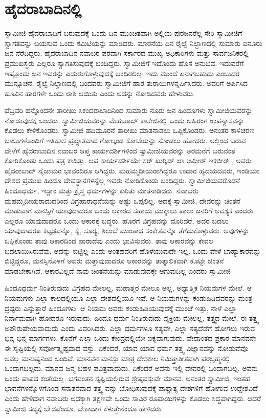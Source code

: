 
\chapter{ಹೈದರಾಬಾದಿನಲ್ಲಿ }

 ಸ್ವಾಮೀಜಿ ಹೈದರಾಬಾದಿಗೆ ಬರುವುದಕ್ಕೆ ಒಂದು ದಿನ ಮುಂಚಿತವಾಗಿ ಅಲ್ಲಿಯ ಪುರಜನರೆಲ್ಲ ಸೇರಿ ಸ್ವಾಮೀಜಿಗೆ ಸ್ವಾಗತವನ್ನು ಬಯಸುವ ಒಂದು ಕಮಿಟಿಯನ್ನು ಮಾಡಿದರು. ಮಾರನೆಯ ದಿನ ರೈಲ್ವೆ ನಿಲ್ದಾಣದಲ್ಲಿ ಸುಮಾರು ಐನೂರು ಜನ ನೆರೆದಿದ್ದರು. ಹೈದರಾಬಾದಿನ ನವಾಬರ ಪರವಾಗಿ ಸರ್ಕಾರದ ಮುಖ್ಯ ಅಧಿಕಾರಿಗಳು ಮತ್ತು ಸಾರ್ವಜನಿಕರಲ್ಲಿ ಪ್ರಮುಖಸ್ಥರು ಎಲ್ಲರೂ ಸ್ವಾಗತಿಸುವುದಕ್ಕೆ ಬಂದಿದ್ದರು. ಸ್ವಾಮೀಜಿಗೆ ಇದೊಂದು ಹೊಸ ಅನುಭವ. ಇದುವರೆಗೆ ಇಷ್ಟೊಂದು ಜನ ಇವರನ್ನು ಎದುರುಗೊಳ್ಳುವುದಕ್ಕೆ ಬಂದಿರಲಿಲ್ಲ. ಇದು ಮುಂದೆ ಏನಾಗಬಹುದು ಎಂಬುದರ ಮುನ್ಸೂಚನೆ. ರೈಲ್ವೆ ನಿಲ್ದಾಣದಲ್ಲಿ ಬಂದವರು ಸ್ವಾಮೀಜಿಗೆ ಹಾರ ತುರಾಯಿಗಳನ್ನರ್ಪಿಸಿದರು. ಅವರಿಗೆ ಅರ್ಪಿಸಿದ ಹೂವಿನ ಹಾರಗಳೇ ಒಂದು ರಾಶಿ ಆಯಿತು ಎಂದು ಅದನ್ನು ನೋಡಿದವರು ಹೇಳುವರು. 

 ಫೆಬ್ರವರಿ ಹನ್ನೊಂದನೇ ತಾರೀಖು ಸಿಕಂದರಾಬಾದಿನಿಂದ ಸುಮಾರು ನೂರು ಜನ ಹಿಂದೂಗಳು ಸ್ವಾಮೀಜಿಯವರನ್ನು ನೋಡುವುದಕ್ಕೆ ಬಂದರು. ಸ್ವಾಮೀಜಿಯವರನ್ನು ಮೆಹಬೂಬ್ ಕಾಲೇಜಿನಲ್ಲಿ ಒಂದು ಬಹಿರಂಗ ಉಪನ್ಯಾಸವನ್ನು ಕೊಡಲು ಕೇಳಿಕೊಂಡರು. ಸ್ವಾಮೀಜಿ ಹದಿಮೂರನೆ ತಾರೀಖು ಮಾತನಾಡಲು ಒಪ್ಪಿಕೊಂಡರು. ಅನಂತರ ಕಾಳಿಚರಣ ಬಾಬುಗಳೊಂದಿಗೆ ಇತಿಹಾಸ ಪ್ರಖ್ಯಾತವಾದ ಗೋಲ್ಕಂಡ ಕೋಟೆಯನ್ನು ನೋಡಲು ಹೋದರು. ಅಲ್ಲಿಂದ ಬರುವ ವೇಳೆಗೆ ಹೈದರಾಬಾದಿನ ನವಾಬರ ಆಪ್ತ ಕಾರ್ಯದರ್ಶಿಗಳಿಂದ ಸ್ವಾಮೀಜಿಯವರನ್ನು ಅರಮನೆಗೆ ಬರುವಂತೆ ಕೋರಿಕೊಂಡು ಒಂದು ಪತ್ರ ಕಾದಿತ್ತು. ಆಪ್ತ ಕಾರ್ಯದರ್ಶಿಯೇ ಸರ್ ಖುರ್‍ಶಿದ್ ಜಾ ಆಮೀರ್ ಇಕಬೀರ್ , ಅವರು ಹೈದರಾಬಾದ್ ನೈಜಾಮರ ಭಾವಂದಿರೂ ಆಗಿದ್ದರು. ಮಹಮ್ಮದೀಯರಾಗಿದ್ದರೂ ಉದಾರ ಹೃದಯದವರು, ಇಂಡಿಯಾ ದೇಶದ ಪ್ರಮುಖ ಹಿಂದೂ ದೇವಸ್ಥಾನಗಳನ್ನೆಲ್ಲ ಇವರು ನೋಡಿಕೊಂಡು ಬಂದಿದ್ದರು. ಸ್ವಾಮೀಜಿಯವರೊಡನೆ ಹಿಂದೂಧರ್ಮ, ಇಸ್ಲಾಂ ಮತ್ತು ಕ್ರೈಸ್ತ ಧರ್ಮಗಳನ್ನು ಕುರಿತು ಮಾತನಾಡಿದರು. ನವಾಬರು ಮಹಮ್ಮದೀಯರಾದುದರಿಂದ ವಿಗ್ರಹಾರಾಧನೆಯನ್ನು ಅಷ್ಟು ಒಪ್ಪಲಿಲ್ಲ. ಅದಕ್ಕೆ ಸ್ವಾಮೀಜಿ, ದೇವರನ್ನು ಚಿಂತನೆ ಮಾಡುವಾಗ ಮನಸ್ಸಿಗೆ ಯಾವುದಾದರೂ ಒಂದು ಆಕಾರದ ಸಹಾಯ ಮುಕ್ಕಾಲು ಪಾಲು ಜನರಿಗೆ ಅವಶ್ಯಕ ಎಂದರು. ಎಲ್ಲರೂ ಯಾವುದಾದರೂ ಒಂದು ಆಕಾರಕ್ಕೆ ಬದ್ಧರು. ಹೊರಗೆ ವಿಗ್ರಹವನ್ನು ದೂರಿದರೆ, ಅದರ ಬದಲು ಯಾವುದಾದರೂ ಕಟ್ಟಡವನ್ನೊ, ಕೈ, ಸೂರ‍್ಯ, ಶಿಲುಬೆ ಮುಂತಾದ ಸಂಕೇತವನ್ನೊ ತೆಗೆದುಕೊಳ್ಳುವರು. ಅವುಗಳನ್ನು ಒಪ್ಪಿಕೊಂಡು ತಾವು ಆಕಾರದಿಂದ ಪಾರಾದೆವು ಎಂದು ಭಾವಿಸುವರು. ತಾವು ಆಕಾರವನ್ನು ಕೇವಲ ಬದಲಾಯಿಸಿರುವೆವು, ಅದನ್ನು ಬಿಟ್ಟಿಲ್ಲ ಎಂದು ಅಂತಹವರಿಗೆ ಹೊಳೆಯುವುದೇ ಇಲ್ಲ. ಒಂದು ವೇಳೆ ಬಾಹ್ಯಾಕಾರವನ್ನು ಬಿಟ್ಟಿದ್ದರೂ, ಮನಸ್ಸಿನೊಳಗೆ ಅವರು ಮತ್ತಾವುದಾದರೂ ಆಕಾರವನ್ನು ತಾತ್ಕಾಲಿಕವಾಗಿ ಕೊಟ್ಟೇ ಚಿಂತನೆ ಮಾಡಬೇಕಾಗಿದೆ. ಆಕಾರವಿಲ್ಲದೆ ನಾವು ಚಿಂತನೆಯನ್ನು ಮಾಡುವುದಕ್ಕೇ ಆಗುವುದಿಲ್ಲ ಎಂದರು ಸ್ವಾಮೀಜಿ

 ಹಿಂದೂಧರ್ಮ ನಿಂತಿರುವುದು ವಿಗ್ರಹದ ಮೇಲಲ್ಲ, ಮಹಾತ್ಮರ ಮೇಲೂ ಅಲ್ಲ, ಅಧ್ಯಾತ್ಮಿಕ ನಿಯಮಗಳ ಮೇಲೆ. ಆ ನಿಯಮಗಳು ಎಲ್ಲಾ ಕಾಲದಲ್ಲಿಯೂ ಎಲ್ಲಾ ದೇಶದಲ್ಲಿಯೂ ಇವೆ. ಆ ನಿಯಮಗಳನ್ನು ಕಂಡುಹಿಡಿದವರನ್ನು ಮಂತ್ರ ದ್ರಷ್ಟರು ಎನ್ನುತ್ತಾರೆ ಹಿಂದೂಗಳು. ಆ ನಿಯಮ ಅವರು ಕಂಡುಹಿಡಿಯುವುದಕ್ಕೆ ಮುಂಚೆ ಇತ್ತು, ನಾಳೆ ಎಲ್ಲಾ ನಿರ್ನಾಮವಾಗಿ ಹೋದರೂ ಇರುವುದು. ಹಿಂದೂ ಧರ್ಮ ನಿಂತಿರುವುದು ವ್ಯಕ್ತಿಯ ಮೇಲಲ್ಲ, ತತ್ತ್ವದ ಮೇಲೆ. ಈ ತತ್ತ್ವ ಅಪೌರುಷೇಯವಾದುದು ಎಂದು ವಿವರಿಸಿದರು. ಎಲ್ಲಾ ಧರ್ಮಗಳೂ ಸತ್ಯವೇ, ಎಲ್ಲಾ ಸತ್ಯದೆಡೆಗೆ ಹೋಗಲು ಇರುವ ಭಿನ್ನ ಭಿನ್ನ ಮಾರ್ಗಗಳು. ಕೊನೆಗೆ ಎಲ್ಲಾ ಒಂದು ಕೇಂದ್ರದಲ್ಲಿಯೇ ಐಕ್ಯವಾಗುವುದು. ವೇದಾಂತದ ಪ್ರಕಾರ ಮಾನವನೇ ಈ ಸೃಷ್ಟಿಯಲ್ಲಿ ಸರ್ವೋತ್ಕೃಷ್ಟವಾದ ವಸ್ತು. ಏಕೆಂದರೆ, ಯಾವ ಯಾವ ಧರ್ಮ ತತ್ತ್ವ ವಿಜ್ಞಾನವನ್ನು ನೋಡುವೆವೊ ಅವೆಲ್ಲ ಮನುಷ್ಯನಿಂದ ಬಂದಿವೆ. ಮಾನವನ ಮನಸ್ಸು ಮಾತ್ರ ದೇಶಕಾಲ ನಿಮಿತ್ತಾತೀತವಾಗಿ ಪರಬ್ರಹ್ಮನಲ್ಲಿ ಒಂದಾಗಬಲ್ಲದು. ಮಾನವ ಜನ್ಮ ಬಹಳ ಪವಿತ್ರವಾದುದು, ಏಕೆಂದರೆ ಅವನು ಇಲ್ಲಿ ದೇವರಲ್ಲಿ ಒಂದಾಗಬಲ್ಲ. ಅವನು ಒಂದು ಪಾಪದ ಕಂತೆಯಲ್ಲ. ಭಗವಂತನ ಸೃಷ್ಟಿಯಲ್ಲಿರುವ ಶ್ರೇಷ್ಠವಸ್ತುವೇ ಮಾನವ. ಅನಂತರ ಸ್ವಾಮೀಜಿ, ಇಂತಹ ಭಾವನೆಗಳನ್ನೊಳಗೊಂಡ ಸನಾತನವಾದ ತತ್ತ್ವ ವನ್ನು ಬೋಧಿಸುವುದಕ್ಕೆ ಪಾಶ್ಚಾತ್ಯ ದೇಶಗಳಿಗೆ ಹೋಗುವ ಉದ್ದೇಶವಿದೆ ಎಂದು ಹೇಳಿದಾಗ ನವಾಬರು ಅದಕ್ಕಾಗಿ ತಕ್ಷಣವೇ ಒಂದು ಸಾವಿರ ರೂಪಾಯಿಗಳನ್ನು ಕೊಡಲು ಸಿದ್ಧವಾಗಿದ್ದರು. ಆದರೆ ಸ್ವಾಮೀಜಿ ಸದ್ಯಕ್ಕೆ ಬೇಡವೆಂದೂ, ಬೇಕಾದಾಗ ಕೆಳುತ್ತೇನೆಂದೂ ಹೇಳಿದರು.

